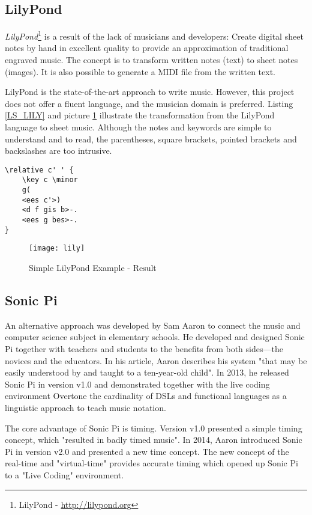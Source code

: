 \subsection{LilyPond}
\label{LIT_PROJ_LILY}
\textit{LilyPond}\footnote{LilyPond - \url{http://lilypond.org}} is a result of the lack of musicians and developers: Create digital sheet notes by hand in excellent quality to provide an approximation of traditional engraved music. The concept is to transform written notes (text) to sheet notes (images). It is also possible to generate a MIDI file from the written text.\cite{LilypoPage}

LilyPond is the state-of-the-art approach to write music. However, this project does not offer a fluent language, and the musician domain is preferred. Listing \ref{LS_LILY} and picture \ref{IMG_LILY} illustrate the transformation from the LilyPond language to sheet music. Although the notes and keywords are simple to understand and to read, the parentheses, square brackets, pointed brackets and backslashes are too intrusive.

\begin{lstlisting}[caption={Simple LilyPond Example - Input\cite{LilypoExmpl}}, label=LS_LILY]
\relative c' ' {
	\key c \minor
	g(
	<ees c'>)
	<d f gis b>-.
	<ees g bes>-.
}
\end{lstlisting}

\begin{figure}[h]
\caption{Simple LilyPond Example - Result\cite{LilypoExmpl}}
\label{IMG_LILY}
\texttt{[image: lily]}
\end{figure}

\subsection{Sonic Pi}
\label{LIT_PROJ_SONICPI}
An alternative approach was developed by Sam Aaron to connect the music and computer science subject in elementary schools. He developed and designed Sonic Pi together with teachers and students to the benefits from both sides—the novices and the educators.\cite{Blackwell2013, Aaron2016Art} In his article, Aaron describes his system "that may be easily understood by and taught to a ten-year-old child".\cite{Aaron2016Art} In 2013, he released Sonic Pi in version v1.0 and demonstrated together with the live coding environment Overtone the cardinality of DSLs and functional languages as a linguistic approach to teach music notation.\cite{Aaron2013}

The core advantage of Sonic Pi is timing. Version v1.0 presented a simple timing concept, which "resulted in badly timed music".\cite{Aaron2014} In 2014, Aaron introduced Sonic Pi in version v2.0 and presented a new time concept. The new concept of the real-time and "virtual-time" provides accurate timing which opened up Sonic Pi to a "Live Coding" environment.\cite{Aaron2014}

